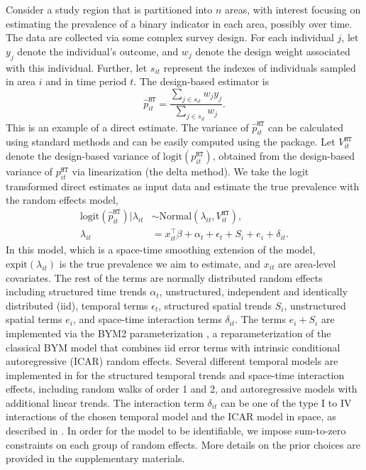 Consider a study region that is partitioned into \(n\) areas, with interest focusing on estimating the prevalence of a binary indicator in each area, possibly over time. The data are collected via some complex survey design. For each individual \(j\), let \(y_j\) denote the individual's outcome, and \(w_j\) denote the design weight associated with this individual. Further, let \(s_{it}\) represent the indexes of individuals sampled in area \(i\) and in time period \(t\). The design-based estimator \citep{horvitz_thompson_52, hajek_71} is
\begin{equation}
\hat p_{it}^{\texttt{HT}} = \frac{\sum_{j \in s_{it}} w_{j}y_j}{\sum_{j \in s_{it}} w_{j}}.
\end{equation}
This is an example of a direct estimate.
The variance of \(\hat p_{it}^{\texttt{HT}}\) can be calculated using standard methods \citep{wolter_07} and can be easily computed using the  package. Let \(V^{\texttt{HT}}_{it}\) denote the design-based variance of \(\mbox{logit}(p_{it}^{\texttt{HT}})\), obtained from the design-based variance of \(p_{it}^{\texttt{HT}}\) via linearization (the delta method). We take the logit transformed direct estimates as input data and estimate the true prevalence with the random effects model,
\begin{align}
\label{eq:smooth-direct}
\mbox{logit}(\hat p_{it}^{\texttt{HT}}) | \lambda_{it} &\sim \mbox{Normal}(\lambda_{it}, V^{\texttt{HT}}_{it}),\\
\label{eq:smooth-direct2}
\lambda_{it} &= x_{it}^\intercal\beta + \alpha_t + \epsilon_t + S_i + e_i + \delta_{it}.
\end{align}
In this model, which is a space-time smoothing extension of the \citet{fay_herriot_79} model, \(\mbox{expit}(\lambda_{it})\) is the true prevalence we aim to estimate, and \(x_{it}\) are area-level covariates. The rest of the terms are normally distributed random effects including structured time trends \(\alpha_t\), unstructured, independent and identically distributed (iid), temporal terms \(\epsilon_t\), structured spatial trends \(S_i\), unstructured spatial terms \(e_i\), and space-time interaction terms \(\delta_{it}\). The terms \(e_i+S_i\) are implemented via the BYM2 parameterization \citep{riebler_etal_16}, a reparameterization of the classical BYM model \citep{besagbayesian} that combines iid error terms with intrinsic conditional autoregressive (ICAR) random effects. Several different temporal models are implemented in  for the structured temporal trends and space-time interaction effects, including random walks of order 1 and 2, and autoregressive models \citep{rue_knorrheld_05} with additional linear trends. The interaction term \(\delta_{it}\) can be one of the type I to IV interactions of the chosen temporal model and the ICAR model in space, as described in \citet{knorrheld_00}.
In order for the model to be identifiable, we impose sum-to-zero constraints on each group of random effects. More details on the prior choices are provided in the supplementary materials.

